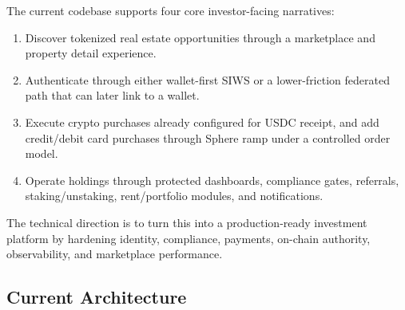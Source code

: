 \documentclass[
  10pt,
  letterpaper,
]{article}
\providecommand{\tightlist}{%
  \setlength{\itemsep}{0pt}\setlength{\parskip}{0pt}}
\begin{document}
The current codebase supports four core investor-facing narratives:

\begin{enumerate}
\def\labelenumi{\arabic{enumi}.}
\tightlist
\item
  Discover tokenized real estate opportunities through a marketplace and
  property detail experience.
\item
  Authenticate through either wallet-first SIWS or a lower-friction
  federated path that can later link to a wallet.
\item
  Execute crypto purchases already configured for USDC receipt, and add
  credit/debit card purchases through Sphere ramp under a controlled
  order model.
\item
  Operate holdings through protected dashboards, compliance gates,
  referrals, staking/unstaking, rent/portfolio modules, and
  notifications.
\end{enumerate}

The technical direction is to turn this into a production-ready
investment platform by hardening identity, compliance, payments,
on-chain authority, observability, and marketplace performance.

\subsection{Current Architecture}\label{current-architecture}
\end{document}
